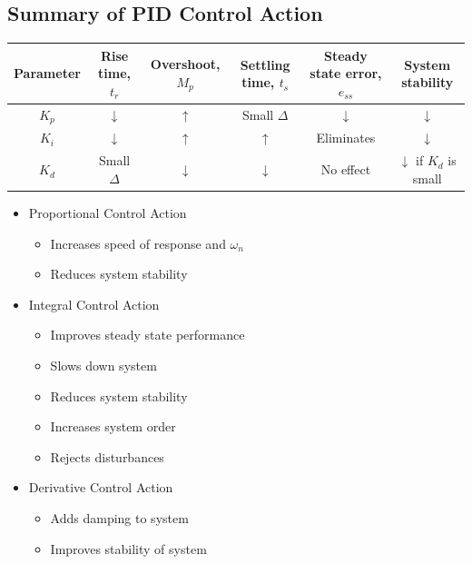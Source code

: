 \documentclass[a4paper]{article}
\begin{document}
\newpage
\subsection{Summary of PID Control Action}
\begin{table}[H]
\centering
\begin{tabular}{|c|c|c|c|c|c|}
\hline
\textbf{Parameter} & \textbf{Rise time, $t_r$} & \textbf{Overshoot, $M_p$} & \textbf{Settling time, $t_s$} & \textbf{Steady state error, $e_{ss}$} & \textbf{System stability}      \\ \hline
$K_p$              & $\downarrow$              & $\uparrow$                & Small $\Delta$                & $\downarrow$                          & $\downarrow$                   \\ \hline
$K_i$              & $\downarrow$              & $\uparrow$                & $\uparrow$                    & Eliminates                            & $\downarrow$                   \\ \hline
$K_d$              & Small $\Delta$            & $\downarrow$              & $\downarrow$                  & No effect                             & $\downarrow$ if $K_d$ is small \\ \hline
\end{tabular}
\end{table}
\begin{itemize}
    \item Proportional Control Action
    \begin{itemize}[label=$\circ$]
        \item Increases speed of response and $\omega_n$
        \item Reduces system stability
    \end{itemize}
    \item Integral Control Action
    \begin{itemize}[label=$\circ$]
        \item Improves steady state performance
        \item Slows down system
        \item Reduces system stability
        \item Increases system order
        \item Rejects disturbances
    \end{itemize}
    \item Derivative Control Action
    \begin{itemize}[label=$\circ$]
        \item Adds damping to system
        \item Improves stability of system
    \end{itemize}
\end{itemize}
\end{document}
